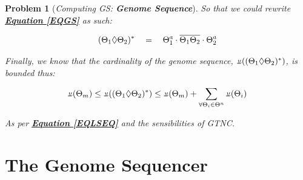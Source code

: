 \documentclass[a4paper, 18pt]{book} %
\newtheorem{prob}{Problem}
\newcommand{\invpi}{\rotatebox[origin=c]{180}{$\pi$}}
\begin{document}
\begin{prob}[\textit{Computing GS: \textbf{Genome Sequence}}]
So that we could rewrite \textbf{\hyperref[EQGS]{Equation \ref{EQGS}}} as such:

\begin{equation}
\label{EQGS2}
(\Theta_1 \Diamond \Theta_2)^* \quad = \quad \Theta_1^a\cdot\overline{\Theta_1\Theta_2}\cdot\Theta_2^a\\\\
\end{equation}

Finally, we know that the cardinality of the genome sequence, $\invpi((\Theta_1 \Diamond \Theta_2)^*)$, is bounded thus:

\begin{equation}
\label{EQBOUNDGS}
\invpi(\Theta_m) \leq \invpi((\Theta_1 \Diamond \Theta_2)^*) \leq \invpi(\Theta_m) + \sum\limits_{\forall \Theta_i \in \Theta^n} \invpi(\Theta_i)
\end{equation}

As per \textbf{\hyperref[EQLSEQ]{Equation  \ref{EQLSEQ}}} and the sensibilities of GTNC\cite{Lutalo2024gtnc}.

\end{prob}

\section{The Genome Sequencer}
\label{SECGENSEQ}
\end{document}
